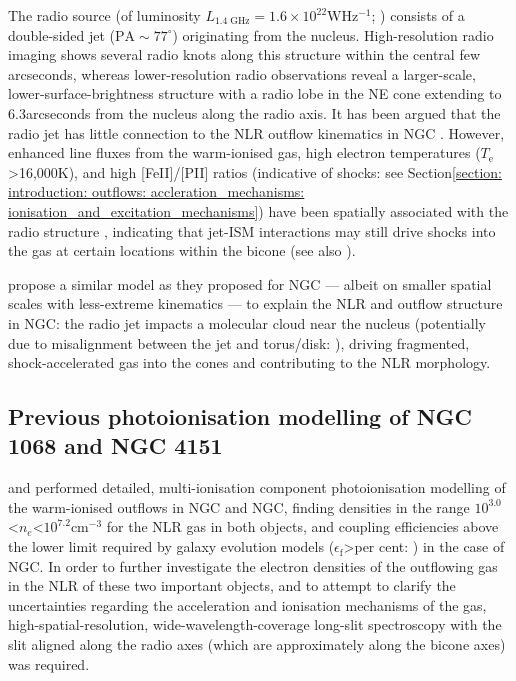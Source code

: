 The radio source (of luminosity $L_\mathrm{1.4\;GHz}=1.6\times10^{22}$\;W\;Hz$^{-1}$; \citealt{Ulvestad1984}) consists of a double-sided jet ($\mathrm{PA}\sim77^\circ$) originating from the nucleus. High-resolution radio imaging \citep{Carral1990, Pedlar1993, Williams2017} shows several radio knots along this structure within the central few arcseconds, whereas lower-resolution radio observations \citep{Johnston1982, Pedlar1993} reveal a larger-scale, lower-surface-brightness structure with a radio lobe in the NE cone extending to 6.3\;arcseconds from the nucleus along the radio axis. It has been argued that the radio jet has little connection to the NLR outflow kinematics in NGC \citep{Hutchings1999, Crenshaw2000_N4151, Das2005}. However, enhanced line fluxes from the warm-ionised gas, high electron temperatures ($T_\mathrm{e}$\;\textgreater16,000\;K), and high [FeII]/[PII] ratios (indicative of shocks: see Section\;\ref{section: introduction: outflows: accleration_mechanisms: ionisation_and_excitation_mechanisms}) have been spatially associated with the radio structure \citep{Mundell2003, Storchi-Bergmann2009, Storchi-Bergmann2010}, indicating that jet-ISM interactions may still drive shocks into the gas at certain locations within the bicone (see also \citealt{Wang2011b, Wang2011, Williams2017}).

\citet{May2020} propose a similar model as they proposed for NGC \citep{May2017} --- albeit on smaller spatial scales with less-extreme kinematics --- to explain the NLR and outflow structure in NGC: the radio jet impacts a molecular cloud near the nucleus (potentially due to misalignment between the jet and torus/disk: \citealt{Storchi-Bergmann2010, May2020}), driving fragmented, shock-accelerated gas into the cones and contributing to the NLR morphology.  

\vfill 
\newpage

\subsection{Previous photoionisation modelling of NGC 1068 and NGC 4151}

\citet{Crenshaw2015} and \citet{Revalski2021, Revalski2022} performed detailed, multi-ionisation component photoionisation modelling of the warm-ionised outflows in NGC and NGC, finding densities in the range \mbox{$10^{3.0}$\;\textless\;$n_e$\;\textless\;$10^{7.2}$\;cm$^{-3}$} for the NLR gas in both objects, and coupling efficiencies above the lower limit required by galaxy evolution models ($\epsilon_\mathrm{f}$\;\textgreater{}\;per cent: \citealt{Hopkins2010}) in the case of NGC. In order to further investigate the electron densities of the outflowing gas in the NLR of these two important objects, and to attempt to clarify the uncertainties regarding the acceleration and ionisation mechanisms of the gas, high-spatial-resolution, wide-wavelength-coverage long-slit spectroscopy with the slit aligned along the radio axes (which are approximately along the bicone axes) was required.

